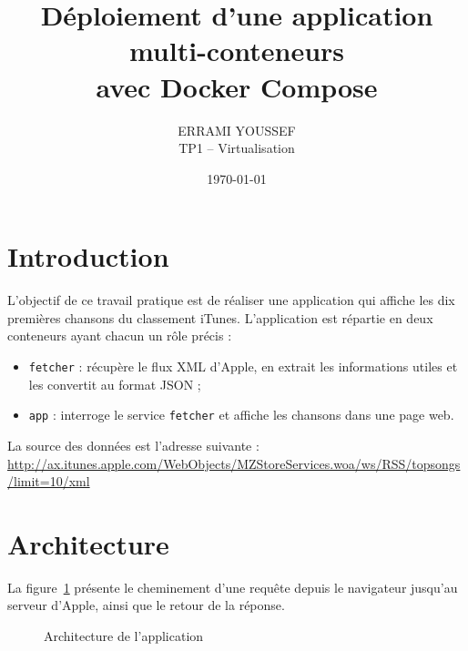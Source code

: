 \documentclass[11pt,a4paper]{article}
\title{Déploiement d'une application multi-conteneurs\\avec Docker Compose}
\author{ERRAMI YOUSSEF\\[2pt] \small TP1 -- Virtualisation}
\date{\today}
\begin{document}
\maketitle
\thispagestyle{fancy}

\section{Introduction}
L'objectif de ce travail pratique est de réaliser une application qui affiche les
dix premières chansons du classement iTunes. L'application est répartie en deux
conteneurs ayant chacun un rôle précis :
\begin{itemize}
  \item \texttt{fetcher} : récupère le flux XML d'Apple, en extrait les informations
        utiles et les convertit au format JSON ;
  \item \texttt{app} : interroge le service \texttt{fetcher} et affiche les chansons
        dans une page web.
\end{itemize}

La source des données est l'adresse suivante :\\
{\small\url{http://ax.itunes.apple.com/WebObjects/MZStoreServices.woa/ws/RSS/topsongs/limit=10/xml}}

\section{Architecture}
La figure~\ref{fig:architecture} présente le cheminement d'une requête depuis le
navigateur jusqu'au serveur d'Apple, ainsi que le retour de la réponse.

\begin{figure}[H]
\centering
{}
\caption{Architecture de l'application}
\label{fig:architecture}
\end{figure}
\end{document}

